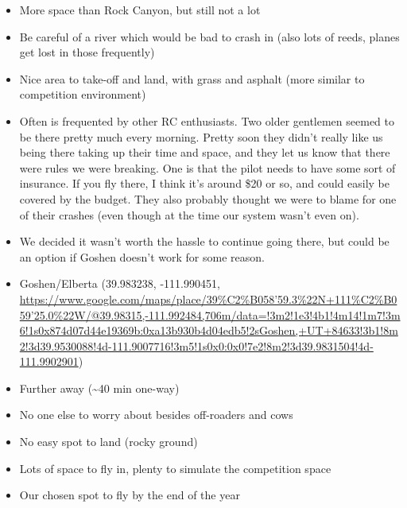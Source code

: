 \documentclass[]{auvsi_doc}
\providecommand{\tightlist}{%
  \setlength{\itemsep}{0pt}\setlength{\parskip}{0pt}}
\begin{document}
\begin{itemize}
\tightlist
\item
  {More space than Rock Canyon, but still not a lot}
\item
  {Be careful of a river which would be bad to crash in (also lots of
  reeds, planes get lost in those frequently)}
\item
  {Nice area to take-off and land, with grass and asphalt (more similar
  to competition environment)}
\item
  {Often is frequented by other RC enthusiasts. Two older gentlemen
  seemed to be there pretty much every morning. Pretty soon they didn't
  really like us being there taking up their time and space, and they
  let us know that there were rules we were breaking. One is that the
  pilot needs to have some sort of insurance. If you fly there, I think
  it's around \$20 or so, and could easily be covered by the budget.
  They also probably thought we were to blame for one of their crashes
  (even though at the time our system wasn't even on). }
\item
  {We decided it wasn't worth the hassle to continue going there, but
  could be an option if Goshen doesn't work for some reason. }
\end{itemize}

\begin{itemize}
\tightlist
\item
  {Goshen/Elberta (}{39.983238, -111.990451,
  }{\href{https://www.google.com/url?q=https://www.google.com/maps/place/39\%25C2\%25B058'59.3\%2522N\%2B111\%25C2\%25B059'25.0\%2522W/@39.98315,-111.992484,706m/data\%3D!3m2!1e3!4b1!4m14!1m7!3m6!1s0x874d07d44e19369b:0xa13b930b4d04edb5!2sGoshen,\%2BUT\%2B84633!3b1!8m2!3d39.9530088!4d-111.9007716!3m5!1s0x0:0x0!7e2!8m2!3d39.9831504!4d-111.9902901\&sa=D\&ust=1564438983446000}{https://www.google.com/maps/place/39\%C2\%B058'59.3\%22N+111\%C2\%B059'25.0\%22W/@39.98315,-111.992484,706m/data=!3m2!1e3!4b1!4m14!1m7!3m6!1s0x874d07d44e19369b:0xa13b930b4d04edb5!2sGoshen,+UT+84633!3b1!8m2!3d39.9530088!4d-111.9007716!3m5!1s0x0:0x0!7e2!8m2!3d39.9831504!4d-111.9902901}}{)}
\end{itemize}

\begin{itemize}
\tightlist
\item
  {Further away (\textasciitilde{}40 min one-way)}
\item
  {No one else to worry about besides off-roaders and cows}
\item
  {No easy spot to land (rocky ground)}
\item
  {Lots of space to fly in, plenty to simulate the competition space}
\item
  {Our chosen spot to fly by the end of the year}
\end{itemize}
\end{document}
